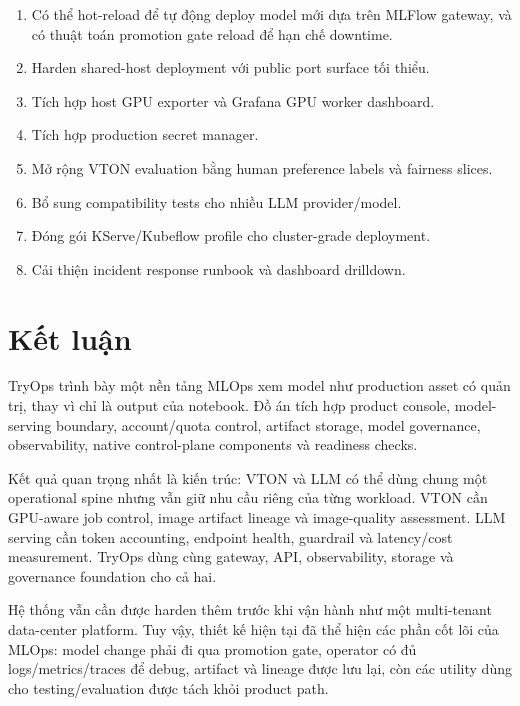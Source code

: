 \documentclass[12pt,a4paper,oneside]{report}
\begin{document}
\begin{enumerate}
  \item Có thể hot-reload để tự động deploy model mới dựa trên MLFlow gateway, và có thuật toán promotion gate reload để hạn chế downtime.
  \item Harden shared-host deployment với public port surface tối thiểu.
  \item Tích hợp host GPU exporter và Grafana GPU worker dashboard.
  \item Tích hợp production secret manager.
  \item Mở rộng VTON evaluation bằng human preference labels và fairness slices.
  \item Bổ sung compatibility tests cho nhiều LLM provider/model.
  \item Đóng gói KServe/Kubeflow profile cho cluster-grade deployment.
  \item Cải thiện incident response runbook và dashboard drilldown.
\end{enumerate}

\chapter{Kết luận}

TryOps trình bày một nền tảng MLOps xem model như production asset có quản trị, thay vì chỉ là output của notebook. Đồ án tích hợp product console, model-serving boundary, account/quota control, artifact storage, model governance, observability, native control-plane components và readiness checks.

Kết quả quan trọng nhất là kiến trúc: VTON và LLM có thể dùng chung một operational spine nhưng vẫn giữ nhu cầu riêng của từng workload. VTON cần GPU-aware job control, image artifact lineage và image-quality assessment. LLM serving cần token accounting, endpoint health, guardrail và latency/cost measurement. TryOps dùng cùng gateway, API, observability, storage và governance foundation cho cả hai.

Hệ thống vẫn cần được harden thêm trước khi vận hành như một multi-tenant data-center platform. Tuy vậy, thiết kế hiện tại đã thể hiện các phần cốt lõi của MLOps: model change phải đi qua promotion gate, operator có đủ logs/metrics/traces để debug, artifact và lineage được lưu lại, còn các utility dùng cho testing/evaluation được tách khỏi product path.
\end{document}
